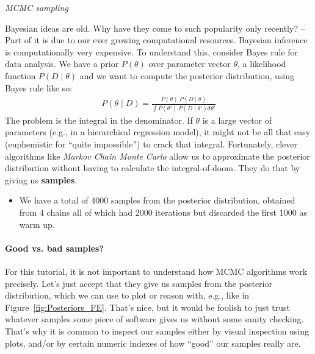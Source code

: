 \documentclass[nobib]{tufte-handout}
\begin{document}
\begin{InfoBox}[]
\centering
\colorbox{mygray}{\centering
  \begin{minipage}{1\textwidth}

    \emph{MCMC sampling}
    \medskip
 
    Bayesian ideas are old. Why have they come to such popularity only recently? -- 
    Part of it is due to our ever growing computational resources. Bayesian inference is computationally very expensive. To understand this,
    consider Bayes rule for data analysis. We have a prior $P(\theta)$ over parameter vector
    $\theta$, a likelihood function $P(D\mid\theta)$ and we want to compute the posterior
    distribution, using Bayes rule like so:
    \begin{eqnarray*}
      P(\theta \mid D) = \frac{P(\theta) \ P(D \mid \theta)}{ \int P(\theta') \ P(D \mid
      \theta') \textrm{d}\theta'}
    \end{eqnarray*}
    The problem is the integral in the denominator.
    If $\theta$ is a large vector of parameters
    (e.g., in a hierarchical regression model), it might not be all that easy (euphemistic for
    ``quite impossible'') to crack that integral. Fortunately, clever algorithms like \emph{Markov Chain
      Monte Carlo} allow us to approximate the posterior distribution without having to
    calculate the integral-of-doom. They do that by giving us \textbf{samples}.

    \begin{itemize}
    \item We have a total of 4000 samples from the posterior distribution, obtained from 4
      chains all of which had 2000 iterations but discarded the first 1000 as warm up.
    \end{itemize}
    
\paragraph{Good vs. bad samples?}  
    For this tutorial, it is not important to understand how MCMC algorithms work precisely.
    Let's just accept that they give us samples from the posterior distribution, which we can
    use to plot or reason with, e.g., like in Figure~\ref{fig:Posteriors_FE}. That's nice, but
    it would be foolish to just trust whatever samples some piece of software gives us without
    some sanity checking. That's why it is common to inspect our samples either by visual
    inspection using plots, and/or by certain numeric indexes of  how ``good'' our samples really are.
    

\end{minipage}}
\end{InfoBox}
\end{document}
